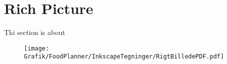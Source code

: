 \section{Rich Picture}
Thi section is about 


\begin{figure}[H]
	\centering
	\texttt{[image: Grafik/FoodPlanner/InkscapeTegninger/RigtBilledePDF.pdf]}
\end{figure}